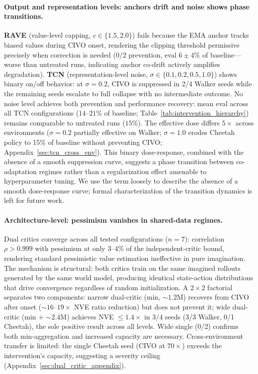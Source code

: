 \paragraph{Output and representation levels: anchors drift and noise shows phase transitions.}
\textbf{RAVE} (value-level capping, $c \in \{1.5, 2.0\}$) fails because the EMA anchor tracks biased values during CIVO onset, rendering the clipping threshold permissive precisely when correction is needed (0/2 prevention, eval $6{\pm}4$\% of baseline---worse than untreated runs, indicating anchor co-drift actively amplifies degradation). \textbf{TCN} (representation-level noise, $\sigma \in \{0.1, 0.2, 0.5, 1.0\}$) shows binary on/off behavior: at $\sigma{=}0.2$, CIVO is suppressed in 2/4 Walker seeds while the remaining seeds escalate to full collapse with no intermediate outcome. No noise level achieves both prevention and performance recovery: mean eval across all TCN configurations ($14$--$21$\% of baseline; Table~\ref{tab:intervention_hierarchy}) remains comparable to untreated runs ($15$\%). The effective dose differs $5\times$ across environments ($\sigma{=}0.2$ partially effective on Walker; $\sigma{=}1.0$ erodes Cheetah policy to 15\% of baseline without preventing CIVO; Appendix~\ref{sec:tcn_cross_env}). This binary dose-response, combined with the absence of a smooth suppression curve, suggests a phase transition between co-adaptation regimes rather than a regularization effect amenable to hyperparameter tuning. We use the term loosely to describe the absence of a smooth dose-response curve; formal characterization of the transition dynamics is left for future work.

\paragraph{Architecture-level: pessimism vanishes in shared-data regimes.}
Dual critics converge across all tested configurations ($n{=}7$): correlation $\rho > 0.999$ with pessimism at only 3--4\% of the independent-critic bound, rendering standard pessimistic value estimation ineffective in pure imagination. The mechanism is structural: both critics train on the same imagined rollouts generated by the same world model, producing identical state-action distributions that drive convergence regardless of random initialization. A $2{\times}2$ factorial separates two components: narrow dual-critic (min, ${\sim}1.2$M) recovers from CIVO after onset (${\sim}16$--$19\times$ NVE ratio reduction) but does not prevent it; wide dual-critic (min $+$ ${\sim}2.4$M) achieves NVE $\leq 1.4\times$ in 3/4 seeds (3/3 Walker, 0/1 Cheetah), the sole positive result across all levels. Wide single (0/2) confirms both min-aggregation and increased capacity are necessary. Cross-environment transfer is limited: the single Cheetah seed (CIVO at $70\times$) exceeds the intervention's capacity, suggesting a severity ceiling (Appendix~\ref{sec:dual_critic_appendix}).

